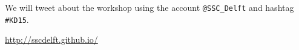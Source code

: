 \documentclass{article}
\begin{document}
\bigskip
We will tweet about the workshop using the account \texttt{@SSC\_Delft} and hashtag \texttt{\#KD15}.

\vfill

\begin{center}
 \href{http://sscdelft.github.io/}{http://sscdelft.github.io/}
\end{center}
\end{document}
